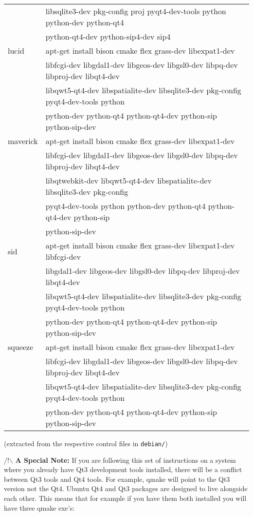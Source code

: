 \begin{center}
\begin{tabular}{|l|l|}
& libsqlite3-dev pkg-config proj pyqt4-dev-tools python python-dev python-qt4 \\
& python-qt4-dev python-sip4-dev sip4 \\
\hline lucid & apt-get install  bison cmake flex grass-dev libexpat1-dev \\
& libfcgi-dev libgdal1-dev libgeos-dev libgsl0-dev libpq-dev libproj-dev libqt4-dev \\
& libqwt5-qt4-dev libspatialite-dev libsqlite3-dev pkg-config pyqt4-dev-tools python \\
& python-dev python-qt4 python-qt4-dev python-sip python-sip-dev \\
\hline maverick & apt-get install  bison cmake flex grass-dev libexpat1-dev \\
& libfcgi-dev libgdal1-dev libgeos-dev libgsl0-dev libpq-dev libproj-dev libqt4-dev \\
& libqtwebkit-dev libqwt5-qt4-dev libspatialite-dev libsqlite3-dev pkg-config \\
& pyqt4-dev-tools python python-dev python-qt4 python-qt4-dev python-sip \\
& python-sip-dev \\
\hline sid & apt-get install  bison cmake flex grass-dev libexpat1-dev libfcgi-dev \\
& libgdal1-dev libgeos-dev libgsl0-dev libpq-dev libproj-dev libqt4-dev \\
& libqwt5-qt4-dev libspatialite-dev libsqlite3-dev pkg-config pyqt4-dev-tools python \\
& python-dev python-qt4 python-qt4-dev python-sip python-sip-dev \\
\hline squeeze & apt-get install  bison cmake flex grass-dev libexpat1-dev \\
& libfcgi-dev libgdal1-dev libgeos-dev libgsl0-dev libpq-dev libproj-dev libqt4-dev \\
& libqwt5-qt4-dev libspatialite-dev libsqlite3-dev pkg-config pyqt4-dev-tools python \\
& python-dev python-qt4 python-qt4-dev python-sip python-sip-dev \\
\hline \end{tabular}\end{center}

(extracted from the respective control files in \texttt{debian/})

/!$\backslash$ \textbf{A Special Note:} If you are following this set of instructions on
a system where you already have Qt3 development tools installed, there will
be a conflict between Qt3 tools and Qt4 tools. For example, qmake will
point to the Qt3 version not the Qt4. Ubuntu Qt4 and Qt3 packages are
designed to live alongside each other. This means that for example if you
have them both installed you will have three qmake exe's:


